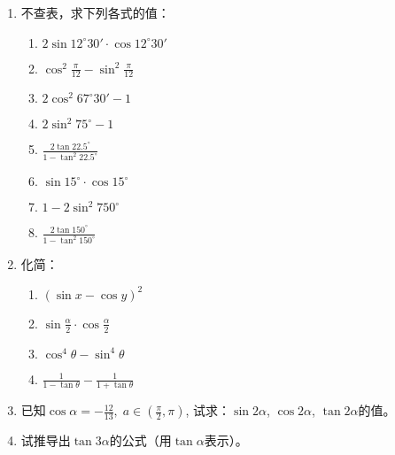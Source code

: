 \begin{ex}
\begin{enumerate}
    \item 不查表，求下列各式的值：
\begin{multicols}{2}
\begin{enumerate}
    \item $2\sin12^{\circ}30'\cdot \cos12^{\circ}30'$
    \item $\cos^2\frac{\pi}{12}-\sin^2\frac{\pi}{12}$
    \item $2\cos^2 67^{\circ}30'-1$
    \item $2\sin^2 75^{\circ}-1$
    \item $\frac{2\tan 22.5^{\circ}}{1-\tan^2 22.5^{\circ}}$
    \item $\sin 15^{\circ}\cdot \cos 15^{\circ}$
    \item $1-2\sin^2 750^{\circ}$
    \item $\frac{2\tan 150^{\circ}}{1-\tan^2 150^{\circ}}$
\end{enumerate}
\end{multicols}
\item 化简：
\begin{multicols}{2}
\begin{enumerate}
    \item $(\sin x-\cos y)^2$
    \item $\sin \frac{\alpha}{2}\cdot\cos\frac{\alpha}{2}$
    \item $\cos^4\theta-\sin^4\theta$
    \item $\frac{1}{1-\tan\theta}-\frac{1}{1+\tan\theta}$
\end{enumerate}
\end{multicols}

\item     已知$\cos\alpha=-\frac{12}{13},\; a\in \left(\frac{\pi}{2},\pi\right)$, 试求：$\sin2\alpha$, $\cos2\alpha$, $\tan2\alpha$的值。

\item 试推导出$\tan3\alpha$的公式（用$\tan\alpha$表示）。


\end{enumerate}
\end{ex}
